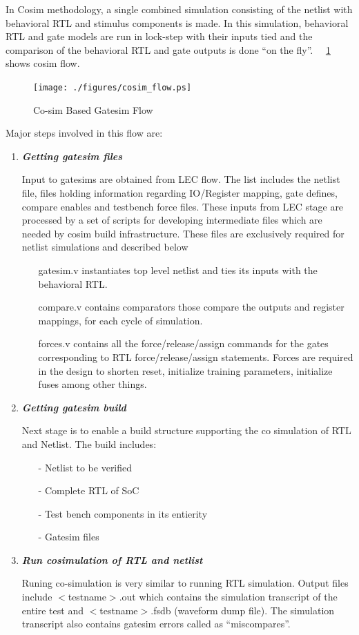  In Cosim methodology, a single combined simulation consisting of the netlist with behavioral RTL and stimulus components is made. In this simulation, behavioral RTL and gate models are run in lock-step with their inputs tied and the comparison of the behavioral RTL and gate outputs is done ``on the fly''. ~\figurename{~\ref{fig:cosim_flow.ps}} shows cosim flow.




\begin{figure}[h]
\centering
\texttt{[image: ./figures/cosim\_flow.ps]}
\caption{Co-sim Based Gatesim Flow}
\label{fig:cosim_flow.ps}
\end{figure}

Major steps involved in this flow are:

\begin{enumerate}
	\item \emph{\bf Getting gatesim files}

	Input to gatesims are obtained from LEC flow. The list includes the netlist file, files holding information regarding IO/Register mapping, gate defines, compare enables and testbench force files. These inputs from LEC stage are processed by a set of scripts for developing intermediate files which are needed by cosim build infrastructure. These files are exclusively required for netlist simulations and described below
	\begin{itemize}
		\item[gatesim.v] instantiates top level netlist and ties its inputs with the behavioral RTL.
		\item[compare.v] contains comparators those compare the outputs and register mappings, for each cycle of simulation.
		\item[forces.v] contains all the force/release/assign commands for the gates corresponding to RTL force/release/assign statements. Forces are required in the design to shorten reset, initialize training parameters, initialize fuses among other things.
	\end{itemize}

	\item \emph{\bf Getting gatesim build} 

	Next stage is to enable a build structure supporting the co simulation of RTL and Netlist. The build includes:
	\begin{itemize}
		\item[-]Netlist to be verified
		\item[-]Complete RTL of SoC
		\item[-]Test bench components in its entierity
		\item[-]Gatesim files
	\end{itemize}

	\item \emph{\bf Run cosimulation of RTL and netlist}

	Runing co-simulation is very similar to running RTL simulation. Output files include $<$testname$>$.out which contains the simulation transcript of the entire test and $<$testname$>$.fsdb (waveform dump file). The simulation transcript also contains gatesim errors called as ``miscompares''.
\end{enumerate}


